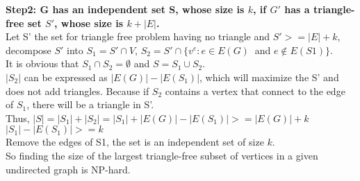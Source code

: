 \documentclass[12pt,a4paper]{article}
\begin{document}
\noindent
\textbf{Step2: G has an independent set S, whose size is $k$, if $G'$ has a triangle-free set $S'$, whose size is $k+|E|$.}\\
Let S' the set for triangle free problem having no triangle and $S'>=|E|+k$, decompose $S'$ into $S_1 = S' \cap V$, $S_2 = S' \cap \{v^e:e \in E(G)\ $ and $e \notin E(S1)\}$.\\
It is obvious that $S_1 \cap S_2 = \emptyset$ and $S=S_1 \cup S_2$.\\
$|S_2|$ can be expressed as $|E(G)|-|E(S_1)|$, which will maximize the S' and does not add triangles. Because if $S_2$ contains a vertex that connect to the edge of $S_1$, there will be a triangle in S'.\\
Thus, $|S| = |S_1|+|S_2|=|S_1|+|E(G)|-|E(S_1)|>=|E(G)|+k $\\
$|S_1|-|E(S_1)|>=k$\\
Remove the edges of S1, the set is an independent set of size $k$.\\
So finding the size of the largest triangle-free subset of vertices in a given undirected graph is NP-hard.
\end{document}
